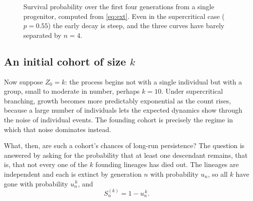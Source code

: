 \begin{figure}[ht]
\centering
\caption{Survival probability over the first four generations from a single
progenitor, computed from \cref{eq:ext}. Even in the supercritical case
($p=0.55$) the early decay is steep, and the three curves have barely separated by
$n=4$.}
\label{fig:earlySn}
\end{figure}

\subsection{An initial cohort of size \texorpdfstring{$k$}{k}}
\label{sec:cohort}

Now suppose $Z_0=k$: the process begins not with a single individual but with a
group, small to moderate in number, perhaps $k=10$. Under supercritical branching,
growth becomes more predictably exponential as the count rises, because a large
number of individuals lets the expected dynamics show through the noise of
individual events. The founding cohort is precisely the regime in which that noise
dominates instead.

What, then, are such a cohort's chances of long-run persistence? The question is
answered by asking for the probability that at least one descendant remains, that
is, that not every one of the $k$ founding lineages has died out. The lineages are
independent and each is extinct by generation $n$ with probability $u_n$, so all
$k$ have gone with probability $u_n^{\,k}$, and
\begin{equation}
\label{eq:Snk}
S^{(k)}_n = 1-u_n^{\,k} .
\end{equation}

